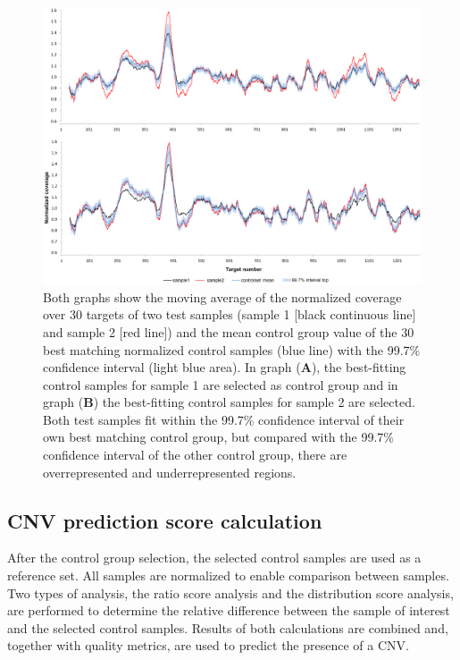 \begin{figure}[!ht]
	\includegraphics[width=1.0\linewidth]{img/CoNVaDING_Fig2}
	\caption[CoNVaDING match control group]{Both graphs show the moving average of the normalized coverage over 30 targets of two test samples (sample 1 [black continuous line] and sample 2 [red line]) and the mean control group value of the 30 best matching normalized control samples (blue line) with the 99.7\% confidence interval (light blue area). In graph (\textbf{A}), the best-fitting control samples for sample 1 are selected as control group and in graph (\textbf{B}) the best-fitting control samples for sample 2 are selected. Both test samples fit within the 99.7\% confidence interval of their own best matching control group, but compared with the 99.7\% confidence interval of the other control group, there are overrepresented and underrepresented regions.}
	\label{fig:CoNVaDING_Fig2}
\end{figure}

\subsection{CNV prediction score calculation}
After the control group selection, the selected control samples are used as a reference set. 
All samples are normalized to enable comparison between samples. Two types of analysis, the ratio score analysis and the distribution score analysis, are performed to determine the relative difference between the sample of interest and the selected control samples. 
Results of both calculations are combined and, together with quality metrics, are used to predict the presence of a CNV. 

